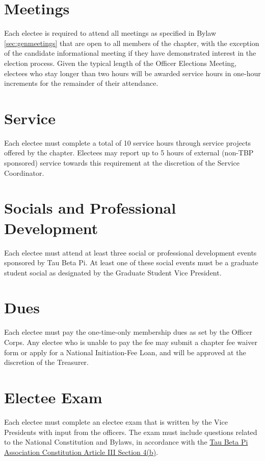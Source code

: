\section{Meetings}
Each electee is required to attend all meetings as specified in Bylaw \ref{sec:genmeetings} that are open to all members of the chapter, with the exception of the 
candidate informational meeting if they have demonstrated interest in the election process. Given the typical length of the Officer Elections Meeting, 
electees who stay longer than two hours will be awarded service hours in one-hour increments for the remainder of their attendance.


\section{Service}
Each electee must complete a total of 10 service hours through service projects offered by the chapter. 
Electees may report up to 5 hours of external (non-TBP sponsored) service towards this requirement at the discretion of the Service Coordinator.
\section{Socials and Professional Development}\label{sec:grsocialreq}
Each electee must attend at least three social or professional development events sponsored by Tau Beta Pi. 
At least one of these social events must be a graduate student social as designated by the Graduate Student Vice President.
\section{Dues}
Each electee must pay the one-time-only membership dues as set by the Officer Corps. 
Any electee who is unable to pay the fee may submit a chapter fee waiver form or apply for a National Initiation-Fee Loan, and will be approved at the discretion of the Treasurer.
\section{Electee Exam}
Each electee must complete an electee exam that is written by the Vice Presidents with input from the officers. 
The exam must include questions related to the National Constitution and Bylaws, 
in accordance with the \href{http://www.tbp.org/off/ConstBylaw.pdf}{Tau Beta Pi Association Constitution Article III Section 4(b)}. 
